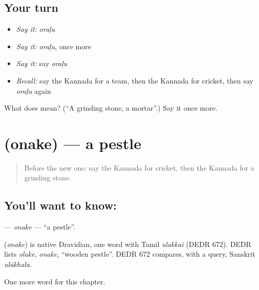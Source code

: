 \subsection*{Your turn}
\begin{itemize}
\raggedright
  \item \emph{Say it:} \emph{oraḷu}
  \item \emph{Say it:} \emph{oraḷu}, once more
  \item \emph{Say it:} say \emph{oraḷu}
  \item \emph{Recall:} say the Kannada for a team, then the Kannada for cricket, then say \emph{oraḷu} again
\end{itemize}

\begin{tcolorbox}[breakable,colback=teal!4,colframe=teal!35!black,title={Before you move on}]
What does  mean? (\textquotedblleft{}A grinding stone, a mortar\textquotedblright{}.) Say it once more.
\end{tcolorbox}
\section[\texorpdfstring{\kn{ಒನಕೆ} (onake)}{ಒನಕೆ (onake)}]{ (onake) — a pestle}

\label{lesson:KA-C192-onake}



\begin{quote}
Before the new one: say the Kannada for cricket, then the Kannada for a grinding stone.
\end{quote}

\subsection*{You'll want to know: }
\textbf{} — \emph{onake} — \textquotedblleft{}a pestle\textquotedblright{}.

\begin{cousinweb}
\textbf{} (\emph{onake}) is native Dravidian, one word with Tamil \emph{ulakkai} (DEDR 672). DEDR lists \emph{olake}, \emph{onake}, \textquotedblleft{}wooden pestle\textquotedblright{}. DEDR 672 compares, with a query, Sanskrit \emph{ulūkhala}.
\end{cousinweb}

\begin{grammarlens}[title={What you've built}]
One more word for this chapter.
\end{grammarlens}

